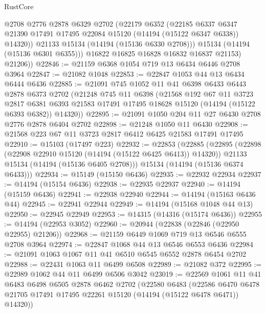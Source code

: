 \begin{lexlean}{RustCore}
\begin{coremodule}
              @2708
              @2776
              @2878
              @6329
              @2702
              (@22179
                @6352
                (@22185
                  @6337
                  @6347
                  @21390
                  @17491
                  @17495
                  @22084
                  @15120
                  (@14194 (@15122 @6347 @6338))
                  @14320))
              @21133
              @15134
              (@14194 (@15136 @6330 @2708)))
            @15134
            (@14194 (@15136 @6301 @6355)))
          @16822
          @16825
          @16828
          @16832
          @16837
          @21153)
        @21206))
@22846 := @21159 @6368 @1054 @719 @13 @6434 @6446 @2708 @3964
@22847 := @21082 @1048
@22853 := @22847 @1053 @44 @13 @6434 @6444 @6436
@22885 := @21091
    @745
    @1052
    @11
    @41
    @6398
    @6433
    @6443
    @2878
    @6373
    @2702
    (@21248
      @745
      @11
      @6398
      (@21568
        @192
        @67
        @11
        @3723
        @2817
        @6381
        @6393
        @21583
        @17491
        @17495
        @18628
        @15120
        (@14194 (@15122 @6393 @6382))
        @14320))
@22895 := @21091 @1050 @204 @11 @27 @6430 @2708 @2776 @2878 @6404 @2702
@22898 := @21248 @1050 @11 @6430
@22908 := @21568 @223 @67 @11 @3723 @2817 @6412 @6425 @21583 @17491 @17495
@22910 := @15103 (@17497 @223)
@22932 := @22853
    (@22885
      (@22895
        (@22898 (@22908 @22910 @15120 (@14194 (@15122 @6425 @6413)) @14320))
        @21133
        @15134
        (@14194 (@15136 @6405 @2708)))
      @15134
      (@14194 (@15136 @6374 @6433)))
@22934 := @15149 (@15150 @6436)
@22935 := @22932 @22934
@22937 := @14194 (@15154 @6436)
@22938 := @22935 @22937
@22940 := @14194 (@15159 @6436)
@22941 := @22938 @22940
@22944 := @14194 (@15163 @6436 @44)
@22945 := @22941 @22944
@22949 := @14194 (@15168 @1048 @44 @13)
@22950 := @22945 @22949
@22953 := @14315 (@14316 (@15174 @6436))
@22955 := @14194 (@22953 @3052)
@22960 := @20944 (@22838 (@22846 (@22950 @22955) @21206))
@22968 := @21159 @6449 @1069 @719 @13 @6546 @6555 @2708 @3964
@22974 := @22847 @1068 @44 @13 @6546 @6553 @6436
@22984 := @21091 @1063 @1067 @11 @41 @6510 @6545 @6552 @2878 @6454 @2702
@22988 := @22431 @1063 @11 @6499 @6508
@22989 := @21082 @372
@22995 := @22989 @1062 @44 @11 @6499 @6506 @3042
@23019 := @22569
    @1061
    @11
    @41
    @6483
    @6498
    @6505
    @2878
    @6462
    @2702
    (@22580
      @6483
      (@22586 @6470 @6478 @21705 @17491 @17495 @22261 @15120 (@14194 (@15122 @6478 @6471)) @14320))

\end{coremodule}
\end{lexlean}
